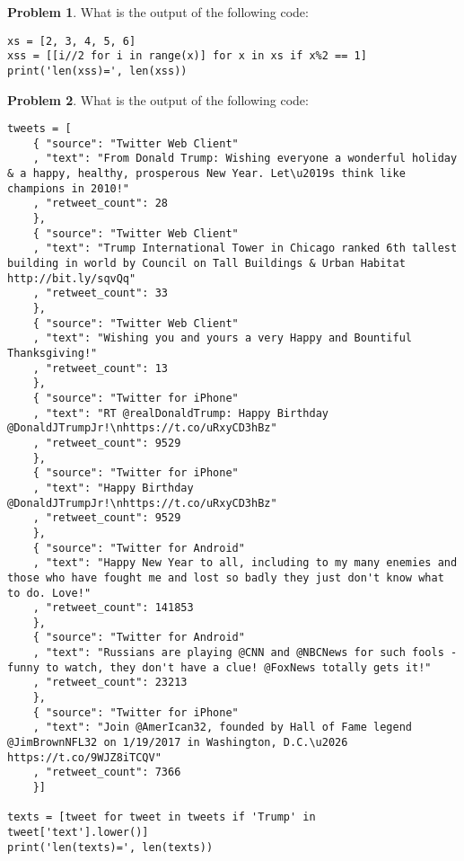 \documentclass[10pt]{article}
\theoremstyle{definition}
\newtheorem{problem}{Problem}
\begin{document}
\begin{problem}
    What is the output of the following code:
\end{problem}
\begin{lstlisting}
xs = [2, 3, 4, 5, 6]
xss = [[i//2 for i in range(x)] for x in xs if x%2 == 1]
print('len(xss)=', len(xss))
\end{lstlisting}
\vspace{1.5in}


\newpage
\begin{problem}
    What is the output of the following code:
\end{problem}
\begin{lstlisting}
tweets = [
    { "source": "Twitter Web Client"
    , "text": "From Donald Trump: Wishing everyone a wonderful holiday & a happy, healthy, prosperous New Year. Let\u2019s think like champions in 2010!"
    , "retweet_count": 28
    }, 
    { "source": "Twitter Web Client"
    , "text": "Trump International Tower in Chicago ranked 6th tallest building in world by Council on Tall Buildings & Urban Habitat http://bit.ly/sqvQq"
    , "retweet_count": 33
    },
    { "source": "Twitter Web Client"
    , "text": "Wishing you and yours a very Happy and Bountiful Thanksgiving!"
    , "retweet_count": 13
    },
    { "source": "Twitter for iPhone"
    , "text": "RT @realDonaldTrump: Happy Birthday @DonaldJTrumpJr!\nhttps://t.co/uRxyCD3hBz"
    , "retweet_count": 9529
    },
    { "source": "Twitter for iPhone"
    , "text": "Happy Birthday @DonaldJTrumpJr!\nhttps://t.co/uRxyCD3hBz"
    , "retweet_count": 9529
    },
    { "source": "Twitter for Android"
    , "text": "Happy New Year to all, including to my many enemies and those who have fought me and lost so badly they just don't know what to do. Love!"
    , "retweet_count": 141853
    },
    { "source": "Twitter for Android"
    , "text": "Russians are playing @CNN and @NBCNews for such fools - funny to watch, they don't have a clue! @FoxNews totally gets it!"
    , "retweet_count": 23213
    },
    { "source": "Twitter for iPhone"
    , "text": "Join @AmerIcan32, founded by Hall of Fame legend @JimBrownNFL32 on 1/19/2017 in Washington, D.C.\u2026 https://t.co/9WJZ8iTCQV"
    , "retweet_count": 7366
    }]

texts = [tweet for tweet in tweets if 'Trump' in tweet['text'].lower()]
print('len(texts)=', len(texts))
\end{lstlisting}
\vspace{1.5in}
\end{document}
